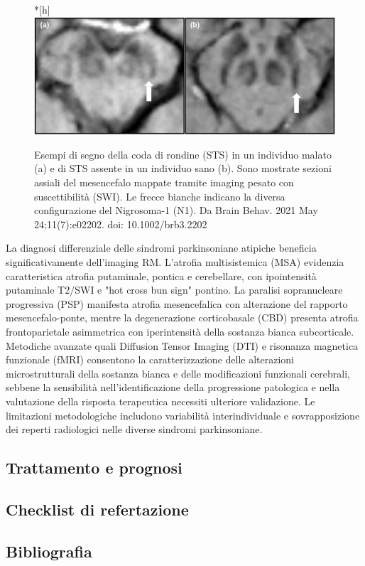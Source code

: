 \begin{figure}*[h]
	\centering
	\includegraphics[width=0.8\linewidth]{FileAusiliari/Immagini/degenerative/BRB3-11-e02202-g002}
	\caption{Esempi di segno della coda di rondine (STS) in un individuo malato (a) e di STS assente in un individuo sano (b). Sono mostrate sezioni assiali del mesencefalo mappate tramite imaging pesato con suscettibilità (SWI). Le frecce bianche indicano la diversa configurazione del Nigrosoma-1 (N1). Da Brain Behav. 2021 May 24;11(7):e02202. doi: 10.1002/brb3.2202}
	\label{fig:brb3-11-e02202-g002}
\end{figure}


La diagnosi differenziale delle sindromi parkinsoniane atipiche beneficia significativamente dell'imaging RM. L'atrofia multisistemica (MSA) evidenzia caratteristica atrofia putaminale, pontica e cerebellare, con ipointensità putaminale T2/SWI e "hot cross bun sign" pontino. La paralisi sopranucleare progressiva (PSP) manifesta atrofia mesencefalica con alterazione del rapporto mesencefalo-ponte, mentre la degenerazione corticobasale (CBD) presenta atrofia frontoparietale asimmetrica con iperintensità della sostanza bianca subcorticale.
Metodiche avanzate quali Diffusion Tensor Imaging (DTI) e risonanza magnetica funzionale (fMRI) consentono la caratterizzazione delle alterazioni microstrutturali della sostanza bianca e delle modificazioni funzionali cerebrali, sebbene la sensibilità nell'identificazione della progressione patologica e nella valutazione della risposta terapeutica necessiti ulteriore validazione. Le limitazioni metodologiche includono variabilità interindividuale e sovrapposizione dei reperti radiologici nelle diverse sindromi parkinsoniane.

\subsection{Trattamento e prognosi}

\subsection{Checklist di refertazione}

\subsection{Bibliografia}
\small{
	
	
}

